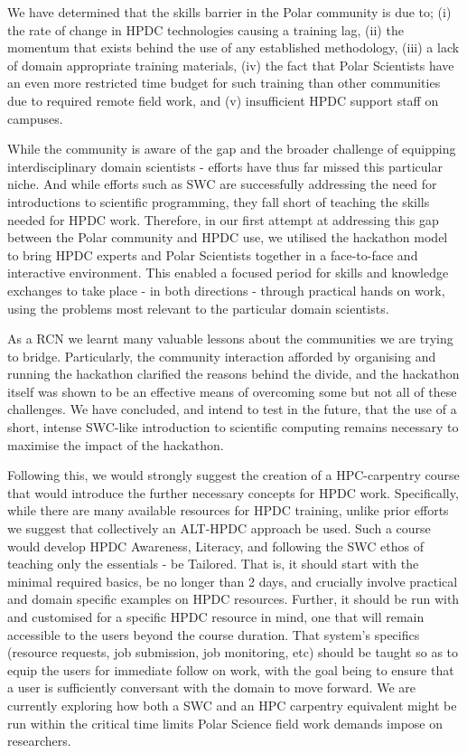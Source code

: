 \documentclass[conference]{IEEEtran}
\begin{document}
We have determined that the skills barrier in the Polar community is due to; (i) the rate of change in HPDC technologies causing a training lag, (ii) the momentum that exists behind the use of any established methodology, (iii) a lack of domain appropriate training materials, (iv) the fact that Polar Scientists have an even more restricted time budget for such training than other communities due to required remote field work, and (v) insufficient HPDC support staff on campuses.

While the community is aware of the gap and the broader challenge of equipping interdisciplinary domain scientists - efforts have thus far missed this particular niche.  And while efforts such as SWC are successfully addressing the need for introductions to scientific programming, they fall short of teaching the skills needed for HPDC work.  Therefore, in our first attempt at addressing this gap between the Polar community and HPDC use, we utilised the hackathon model to bring HPDC experts and Polar Scientists together in a face-to-face and interactive environment.  This enabled a focused period for skills and knowledge exchanges to take place - in both directions - through practical hands on work, using the problems most relevant to the particular domain scientists.  

As a RCN we learnt many valuable lessons about the communities we are trying to bridge.  Particularly, the community interaction afforded by organising and running the hackathon clarified the reasons behind the divide, and the hackathon itself was shown to be an effective means of overcoming some but not all of these challenges.  We have concluded, and intend to test in the future, that the use of a short, intense SWC-like introduction to scientific computing remains necessary to maximise the impact of the hackathon.  

Following this, we would strongly suggest the creation of a HPC-carpentry course that would introduce the further necessary concepts for HPDC work.  Specifically, while there are many available resources for HPDC training, unlike prior efforts we suggest that collectively an ALT-HPDC approach be used.  Such a course would develop HPDC Awareness, Literacy, and following the SWC ethos of teaching only the essentials - be Tailored.  That is, it should start with the minimal required basics, be no longer than 2 days, and crucially involve practical and domain specific examples on HPDC resources.  Further, it should be run with and customised for a specific HPDC resource in mind, one that will remain accessible to the users beyond the course duration. That system’s specifics (resource requests, job submission, job monitoring, etc) should be taught so as to equip the users for immediate follow on work, with the goal being to ensure that a user is sufficiently conversant with the domain to move forward.  We are currently exploring how both a SWC and an HPC carpentry equivalent might be run within the critical time limits Polar Science field work demands impose on researchers.  
\end{document}

